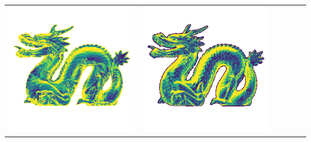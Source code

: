 \begin{center}
\begin{tabularx}{\linewidth}{@{}Y@{}Y@{}Y@{}Y@{}Y@{}Y@{}}
\includegraphics[width=\linewidth]{semisynthetic/20160617_21_yu_err.png} &
\includegraphics[width=\linewidth]{semisynthetic/20160617_21_dpsn_err.png} &

\end{tabularx}
\end{center}
